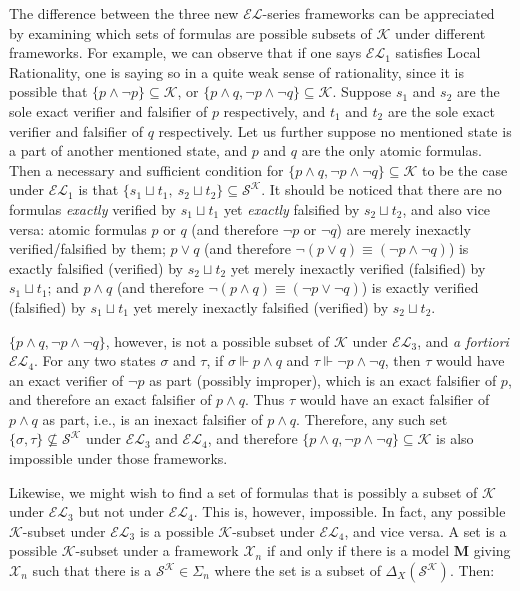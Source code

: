 \documentclass[12pt]{article}
\newcommand{\ver}{\Vdash}
\newcommand{\K}{\mathcal{K}}
\newcommand{\SK}{\mathcal{S}^\mathcal{K}}
\begin{document}
\par
The difference between the three new $\mathcal{EL}$-series frameworks can be appreciated by examining which sets of formulas are possible subsets of $\K$ under different frameworks. For example, we can observe that if one says $\mathcal{EL}_1$ satisfies Local Rationality, one is saying so in a quite weak sense of rationality, since it is possible that $\{p \land \lnot p\} \subseteq \K$, or $\{p \land q, \lnot p \land \lnot q \} \subseteq \K$. Suppose $s_1$ and $s_2$ are the sole exact verifier and falsifier of $p$ respectively, and $t_1$ and $t_2$ are the sole exact verifier and falsifier of $q$ respectively. Let us further suppose  no mentioned state is a part of another mentioned state, and $p$ and $q$ are the only atomic formulas. Then a necessary and sufficient condition for $\{p \land q, \lnot p \land \lnot q \} \subseteq \K$ to be the case under $\mathcal{EL}_1$ is that $\{s_1 \sqcup t_1, \ s_2 \sqcup t_2 \} \subseteq \SK$. It should be noticed that there are no formulas \textit{exactly} verified by $s_1 \sqcup t_1$ yet \textit{exactly} falsified by $s_2 \sqcup t_2$, and also vice versa: atomic formulas $p$ or $q$ (and therefore $\lnot p$ or $\lnot q$) are merely inexactly verified/falsified by them; $p \lor q$ (and therefore $\lnot (p \lor q) \equiv (\lnot p \land \lnot q)$) is exactly falsified (verified) by $s_2 \sqcup t_2$ yet merely inexactly verified (falsified) by $s_1 \sqcup t_1$; and $p \land q$ (and therefore $\lnot (p \land q) \equiv (\lnot p \lor \lnot q)$) is exactly verified (falsified) by $s_1 \sqcup t_1$ yet merely inexactly falsified (verified) by $s_2 \sqcup t_2$. 
\par
$\{p \land q, \lnot p \land \lnot q \}$, however, is not a possible subset of $\K$ under $\mathcal{EL}_3$, and \textit{a fortiori} $\mathcal{EL}_4$. For any two states $\sigma$ and $\tau$, if $\sigma \ver p \land q$ and $\tau \ver \lnot p \land \lnot q$, then $\tau$ would have an exact verifier of $\lnot p$ as part (possibly improper), which is an exact falsifier of $p$, and therefore an exact falsifier of $p \land q$. Thus $\tau$ would have an exact falsifier of $p \land q$ as part, i.e., is an inexact falsifier of $p \land q$. Therefore, any such set $\{\sigma, \tau\} \nsubseteq \SK$ under $\mathcal{EL}_3$ and  $\mathcal{EL}_4$, and therefore $\{p \land q, \lnot p \land \lnot q \} \subseteq \K$ is also impossible under those frameworks. 
\par
Likewise, we might wish to find a set of formulas that is possibly a subset of $\K$ under $\mathcal{EL}_3$ but not under $\mathcal{EL}_4$. This is, however, impossible. In fact, any possible $\K$-subset under $\mathcal{EL}_3$ is a possible $\K$-subset under $\mathcal{EL}_4$, and vice versa. A set is a possible $\K$-subset under a framework $\mathcal{X}_n$ if and only if there is a model $\bm{M}$ giving $\mathcal{X}_n$ such that there is a $\SK \in \Sigma_n$ where the set is a subset of $\Delta_X(\SK)$. Then:
\end{document}
